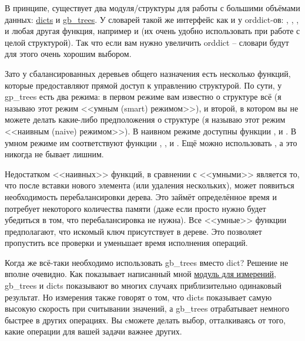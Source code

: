 В принципе, существует два модуля/структуры для работы с большими объёмами данных: \href{http://erldocs.com/R15B/stdlib/dict.html}{dicts} и \href{http://erldocs.com/R15B/stdlib/gb\_trees.html}{gb\_trees}.
У словарей такой же интерфейс как и у orddict\--ов: , , ,  и любая другая функция, например  и  (их очень удобно использовать при работе с целой структурой).
Так что если вам нужно увеличить orddict \--- словари будут для этого очень хорошим выбором.

Зато у сбалансированных деревьев общего назначения есть несколько функций, которые предоставляют прямой доступ к управлению структурой.
По сути, у gp\_trees есть два режима: в первом режиме вам известно о структуре всё (я называю этот режим <<умным (smart) режимом>>), и второй, в котором вы не можете делать какие\--либо предположения о структуре (я называю этот режим <<наивным (naive) режимом>>).
В наивном режиме доступны функции ,  и .
В умном режиме им соответствуют функции , ,  и .
Ещё можно использовать , а это никогда не бывает лишним.

Недостатком <<наивных>> функций, в сравнении с <<умными>> является то, что после вставки нового элемента (или удаления нескольких), может появиться необходимость перебалансировки дерева.
Это займёт определённое время и потребует некоторого количества памяти (даже если просто нужно будет убедиться в том, что перебалансировка не нужна).
Все <<умные>> функции предполагают, что искомый ключ присутствует в дереве.
Это позволяет пропустить все проверки и уменьшает время исполнения операций.

Когда же всё\--таки необходимо использовать gb\_trees вместо dict?
Решение не вполне очевидно.
Как показывает написанный мной \href{http://learnyousomeerlang.com/static/erlang/keyval\_benchmark.erl}{модуль для измерений}, gb\_trees и dicts показывают во многих случаях приблизительно одинаковый результат.
Но измерения также говорят о том, что dicts показывает самую высокую скорость при считывании значений, а gb\_trees отрабатывает немного быстрее в других операциях.
Вы cможете делать выбор, отталкиваясь от того, какие операции для вашей задачи важнее других.
